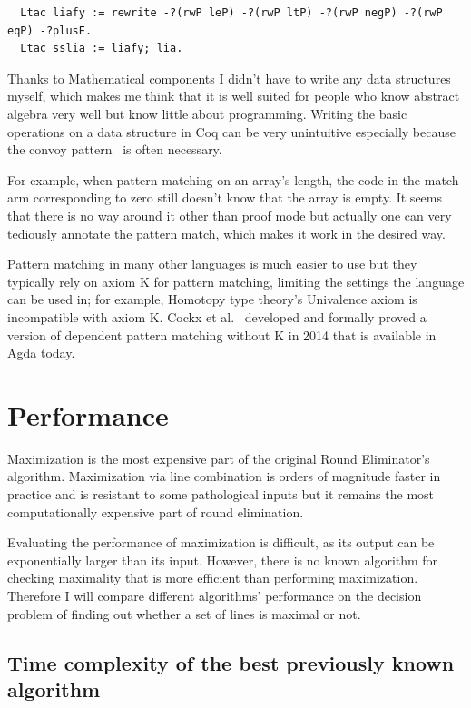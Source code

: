 \documentclass[english, 12pt, a4paper, sci, a-1b, online]{aaltothesis}
\begin{document}
\begin{verbatim}
  Ltac liafy := rewrite -?(rwP leP) -?(rwP ltP) -?(rwP negP) -?(rwP eqP) -?plusE.
  Ltac sslia := liafy; lia.
\end{verbatim}

Thanks to Mathematical components I didn't have to write any data structures myself, which makes me think that it is well suited for people who know abstract algebra very well but know little about programming. Writing the basic operations on a data structure in Coq can be very unintuitive especially because the convoy pattern~\cite{CPDT} is often necessary.

For example, when pattern matching on an array's length, the code in the match arm corresponding to zero still doesn't know that the array is empty. It seems that there is no way around it other than proof mode but actually one can very tediously annotate the pattern match, which makes it work in the desired way.

Pattern matching in many other languages is much easier to use but they typically rely on axiom K for pattern matching, limiting the settings the language can be used in; for example, Homotopy type theory's Univalence axiom is incompatible with axiom K. Cockx et al.~\cite{withoutK} developed and formally proved a version of dependent pattern matching without K in 2014 that is available in Agda today.

\section{Performance}

Maximization is the most expensive part of the original Round Eliminator's algorithm. Maximization via line combination is orders of magnitude faster in practice and is resistant to some pathological inputs but it remains the most computationally expensive part of round elimination. %

Evaluating the performance of maximization is difficult, as its output can be exponentially larger than its input. However, there is no known algorithm for checking maximality that is more efficient than performing maximization. Therefore I will compare different algorithms' performance on the decision problem of finding out whether a set of lines is maximal or not.

\subsection{Time complexity of the best previously known algorithm}
\end{document}
